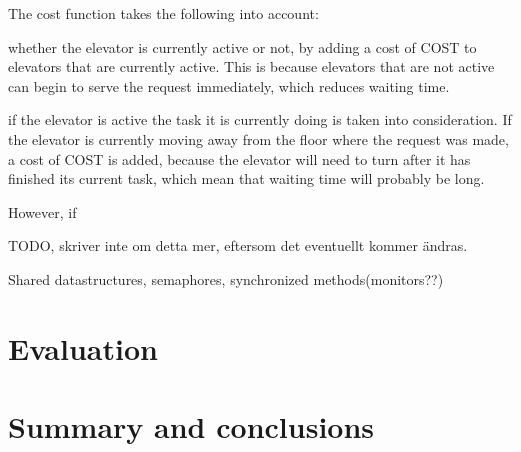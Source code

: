 \documentclass[a4paper]{article}
\begin{document}
The cost function takes the following into account: 

whether the elevator is currently active or not, by adding a cost of COST to elevators that are currently active. This is because elevators that are not active can begin to serve the request immediately, which reduces waiting time.

if the elevator is active the task it is currently doing is taken into consideration. If the elevator is currently moving away from the floor where the request was made, a cost of COST is added, because the elevator will need to turn after it has finished its current task, which mean that waiting time will probably be long.

However, if

TODO, skriver inte om detta mer, eftersom det eventuellt kommer ändras.


 


Shared datastructures, semaphores, synchronized methods(monitors??)


\section{Evaluation}

\section{Summary and conclusions}
\end{document}
